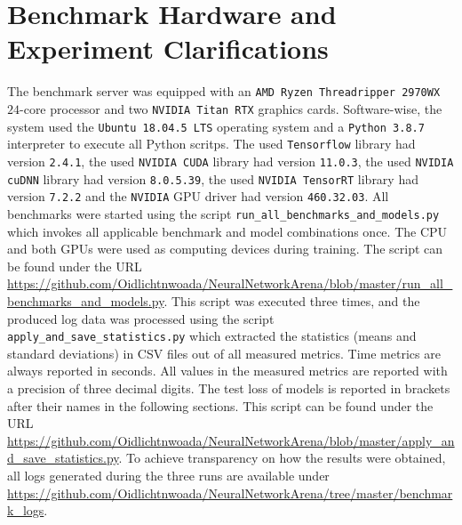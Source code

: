 \documentclass[draft,final]{vutinfth} %
\begin{document}
    \section{Benchmark Hardware and Experiment Clarifications} \label{benchmark_hardware}
    The benchmark server was equipped with an \texttt{AMD Ryzen Threadripper 2970WX} $24$-core processor and two \texttt{NVIDIA Titan RTX} graphics cards.
    Software-wise, the system used the \texttt{Ubuntu 18.04.5 LTS} operating system and a \texttt{Python 3.8.7} \cite{Python3} interpreter to execute all Python scritps.
    The used \texttt{Tensorflow} \cite{Tensorflow} library had version \texttt{2.4.1}, the used \texttt{NVIDIA CUDA} library had version \texttt{11.0.3}, the used \texttt{NVIDIA cuDNN} library \cite{cuDNN} had version \texttt{8.0.5.39}, the used \texttt{NVIDIA TensorRT} library had version \texttt{7.2.2} and the \texttt{NVIDIA} GPU driver had version \texttt{460.32.03}.
    All benchmarks were started using the script \texttt{run\_all\_benchmarks\_and\_models.py} which invokes all applicable benchmark and model combinations once.
    The CPU and both GPUs were used as computing devices during training.
    The script can be found under the URL \url{https://github.com/Oidlichtnwoada/NeuralNetworkArena/blob/master/run_all_benchmarks_and_models.py}.
    This script was executed three times, and the produced log data was processed using the script \texttt{apply\_and\_save\_statistics.py} which extracted the statistics (means and standard deviations) in CSV files out of all measured metrics.
    Time metrics are always reported in seconds.
    All values in the measured metrics are reported with a precision of three decimal digits.
    The test loss of models is reported in brackets after their names in the following sections.
    This script can be found under the URL \url{https://github.com/Oidlichtnwoada/NeuralNetworkArena/blob/master/apply_and_save_statistics.py}.
    To achieve transparency on how the results were obtained, all logs generated during the three runs are available under \url{https://github.com/Oidlichtnwoada/NeuralNetworkArena/tree/master/benchmark_logs}.
\end{document}

